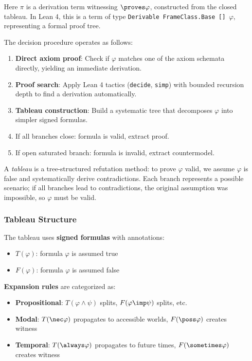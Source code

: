 \documentclass[../BimodalReference.tex]{subfiles}
\begin{document}
Here $\pi$ is a derivation term witnessing $\proves \varphi$, constructed from the closed tableau.
In Lean 4, this is a term of type \texttt{Derivable FrameClass.Base [] $\varphi$}, representing a formal proof tree.

The decision procedure operates as follows:
\begin{enumerate}
  \item \textbf{Direct axiom proof}: Check if $\varphi$ matches one of the axiom schemata directly, yielding an immediate derivation.
  \item \textbf{Proof search}: Apply Lean 4 tactics (\texttt{decide}, \texttt{simp}) with bounded recursion depth to find a derivation automatically.
  \item \textbf{Tableau construction}: Build a systematic tree that decomposes $\varphi$ into simpler signed formulas.
  \item If all branches close: formula is valid, extract proof.
  \item If open saturated branch: formula is invalid, extract countermodel.
\end{enumerate}

A \emph{tableau} is a tree-structured refutation method: to prove $\varphi$ valid, we assume $\varphi$ is false and systematically derive contradictions.
Each branch represents a possible scenario; if all branches lead to contradictions, the original assumption was impossible, so $\varphi$ must be valid.

\subsubsection{Tableau Structure}

The tableau uses \textbf{signed formulas} with annotations:
\begin{itemize}
  \item $T(\varphi)$: formula $\varphi$ is assumed true
  \item $F(\varphi)$: formula $\varphi$ is assumed false
\end{itemize}

\textbf{Expansion rules} are categorized as:
\begin{itemize}
  \item \textbf{Propositional}: $T(\varphi \land \psi)$ splits, $F(\varphi \imp \psi)$ splits, etc.
  \item \textbf{Modal}: $T(\nec\varphi)$ propagates to accessible worlds, $F(\poss\varphi)$ creates witness
  \item \textbf{Temporal}: $T(\always\varphi)$ propagates to future times, $F(\sometimes\varphi)$ creates witness
\end{itemize}
\end{document}
